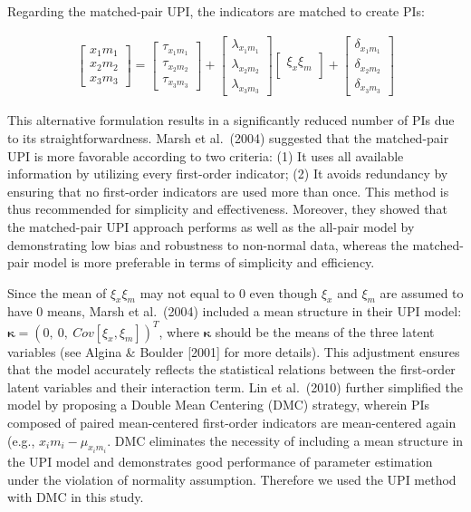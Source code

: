 \documentclass[
  man]{apa6}
\begin{document}
Regarding the matched-pair UPI, the indicators are matched to create PIs:

\begin{align}
    \begin{bmatrix}
        x_{1}m_{1} \\
        x_{2}m_{2} \\
        x_{3}m_{3}
    \end{bmatrix} =
    \begin{bmatrix}
        \tau_{x_{1}m_{1}} \\
        \tau_{x_{2}m_{2}} \\ 
        \tau_{x_{3}m_{3}}
    \end{bmatrix} + 
    \begin{bmatrix}
        \lambda_{x_{1}m_{1}} \\
        \lambda_{x_{2}m_{2}} \\ 
        \lambda_{x_{3}m_{3}} 
    \end{bmatrix}
    \begin{bmatrix}
        \xi_{x}\xi_{m} \\
    \end{bmatrix} +
    \begin{bmatrix}
        \delta_{x_{1}m_{1}} \\
        \delta_{x_{2}m_{2}} \\ 
        \delta_{x_{3}m_{3}}
    \end{bmatrix}
\end{align}

This alternative formulation results in a significantly reduced number of PIs due to its straightforwardness. Marsh et al.~(2004) suggested that the matched-pair UPI is more favorable according to two criteria: (1) It uses all available information by utilizing every first-order indicator; (2) It avoids redundancy by ensuring that no first-order indicators are used more than once. This method is thus recommended for simplicity and effectiveness. Moreover, they showed that the matched-pair UPI approach performs as well as the all-pair model by demonstrating low bias and robustness to non-normal data, whereas the matched-pair model is more preferable in terms of simplicity and efficiency.

Since the mean of \(\xi_{x}\xi_{m}\) may not equal to 0 even though \(\xi_{x}\) and \(\xi_{m}\) are assumed to have 0 means, Marsh et al.~(2004) included a mean structure in their UPI model: \(\mathbf{\kappa} = (0,\ 0,\ Cov[\xi_{x}, \xi_{m}])^T\), where \(\mathbf{\kappa}\) should be the means of the three latent variables (see Algina \& Boulder {[}2001{]} for more details). This adjustment ensures that the model accurately reflects the statistical relations between the first-order latent variables and their interaction term. Lin et al.~(2010) further simplified the model by proposing a Double Mean Centering (DMC) strategy, wherein PIs composed of paired mean-centered first-order indicators are mean-centered again (e.g., \(x_{i}m_{i} - \mu_{x_{i}m_{i}}\). DMC eliminates the necessity of including a mean structure in the UPI model and demonstrates good performance of parameter estimation under the violation of normality assumption. Therefore we used the UPI method with DMC in this study.
\end{document}
